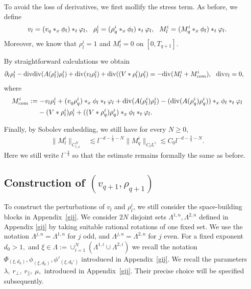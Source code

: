 \documentclass[UTF-8,reqno]{amsart}
\numberwithin{equation}{section}
\theoremstyle{definition}
\def\geq{\geqslant}
\def\div{\mathord{{\rm div}}}
\def\geq{\geqslant}
\def\div{\mathord{{\rm div}}}
\begin{document}
To avoid the loss of derivatives, we first mollify the stress term. As before, 
we define  
\begin{align}
v_l=(v_{q }*_x\phi_l)*_t\varphi_l,\ \ 
 \rho_l^i=(\rho_{q}^i*_x\phi_l)*_t\varphi_l,\ \ M_l^i=(M_{q }^i*_x\phi_l)*_t\varphi_l.\notag
\end{align}
Moreover,    we know that $ \rho_l^i=1 $ and $ M_l^i=0$ on $[0, T_{q+1}]$.
  
By straightforward calculations  we obtain 
\begin{align}
\partial_t \rho_l^i-\div\div(A(\rho_l^i)\rho_l^i)+\div(v_l \rho_l^i)+\div((V*\rho_l^i)\rho_l^i)&=-\div (M^i_l+M^i_{com}),\ \ \div v_l=0,\label{eq:6v_l}
\end{align} where
 \begin{align*}
M_{com}^i&:=-v_l \rho^i_l+(v_{q } \rho^i_{q})*_x\phi_l*_t\varphi_l+\div(A(\rho_l^i) \rho_l^i)-(\div(A(\rho_q^i) \rho_q^i))*_x\phi_l*_t\varphi_l\\
&\ \ \ \   -(V*\rho_l^i)\rho_l^i+((V*\rho_q^i)\rho_q^i)*_x\phi_l*_t\varphi_l.
\end{align*} 
 


Finally, by   Sobolev embedding, we still have for every $N\geq0$,
\begin{align*}
\|M_l^i\|_{C_{t,x}^N}
&\lesssim
l^{-d-\frac13-N}
\|M_q^i\|_{C_tL^1}
\lesssim
C_0l^{-d-\frac43-N}.
\end{align*}
Here we still write $l^{-\frac43}$ so that the estimate remains formally the same as before.
 
   


\subsection{Construction of $(v_{q+1},\rho_{q+1})$}\label{sec:6defq+1}
To construct the perturbations of $v_l$ and $\rho^i_l$, we  still consider the  space-building blocks in Appendix~\ref{gij}.   We consider $2N$ disjoint sets $\Lambda^{1,n}, \Lambda^{2,n}$ defined in Appendix \ref{gij} by taking suitable rational rotations of one fixed set. We use the notation   $ \Lambda^{j,n} =  \Lambda^{1,n}$ for $j$ odd, and $ \Lambda^{j,n} =  \Lambda^{2,n}$ for $j$ even. 
For a fixed exponent
$
d_0>1,
$ and $\xi\in\Lambda:=\cup_{i=1}^N(\Lambda^{1,i}\cup \Lambda^{2,i})$
we   recall the notation
$
\Phi_{(\xi,d_0)},
\phi_{(\xi,d_0)},
\phi'_{(\xi,d_0')}
$
introduced in Appendix~\ref{gij}. 
We  recall the parameters
$
\lambda,\ r_\perp,\ r_\parallel,\  \mu,
$
introduced in Appendix~\ref{gij}. Their precise choice will be specified subsequently.
\end{document}
